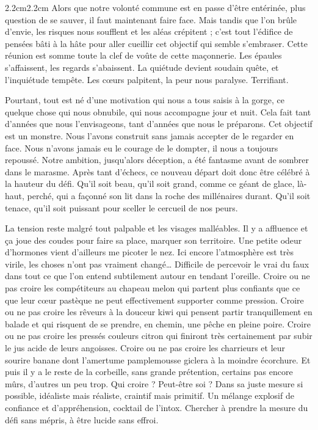 \begin{adjustwidth}{2.2cm}{2.2cm}
Alors que notre volonté commune est en passe d’être entérinée, plus question de se sauver, il faut maintenant faire face. Mais tandis que l’on brûle d’envie, les risques nous soufflent et les aléas crépitent ; c’est tout l’édifice de pensées bâti à la hâte pour aller cueillir cet objectif qui semble s’embraser. Cette réunion est somme toute la clef de voûte de cette maçonnerie. Les épaules s’affaissent, les regards s’abaissent. La quiétude devient soudain quête, et l’inquiétude tempête. Les cœurs palpitent, la peur nous paralyse. Terrifiant.

Pourtant, tout est né d’une motivation qui nous a tous saisis à la gorge, ce quelque chose qui nous obnubile, qui nous accompagne jour et nuit. Cela fait tant d’années que nous l’envisageons, tant d’années que nous le préparons. Cet objectif est un monstre. Nous l’avons construit sans jamais accepter de le regarder en face. Nous n’avons jamais eu le courage de le dompter, il nous a toujours repoussé. Notre ambition, jusqu’alors déception, a été fantasme avant de sombrer dans le marasme. Après tant d’échecs, ce nouveau départ doit donc être célébré à la hauteur du défi. Qu’il soit beau, qu’il soit grand, comme ce géant de glace, là-haut, perché, qui a façonné son lit dans la roche des millénaires durant. Qu’il soit tenace, qu’il soit puissant pour sceller le cercueil de nos peurs.

La tension reste malgré tout palpable et les visages malléables. Il y a affluence et ça joue des coudes pour faire sa place, marquer son territoire. Une petite odeur d’hormones vient d’ailleurs me picoter le nez. Ici encore l’atmosphère est très virile, les choses n’ont pas vraiment changé… Difficile de percevoir le vrai du faux dans tout ce que l’on entend subtilement autour en tendant l’oreille. Croire ou ne pas croire les compétiteurs au chapeau melon qui partent plus confiants que ce que leur cœur pastèque ne peut effectivement supporter comme pression. Croire ou ne pas croire les rêveurs à la douceur kiwi qui pensent partir tranquillement en balade et qui risquent de se prendre, en chemin, une pêche en pleine poire. Croire ou ne pas croire les pressés couleurs citron qui finiront très certainement par subir le jus acide de leurs angoisses. Croire ou ne pas croire les charrieurs et leur sourire banane dont l’amertume pamplemousse giclera à la moindre écorchure. Et puis il y a le reste de la corbeille, sans grande prétention, certains pas encore mûrs, d’autres un peu trop. Qui croire ? Peut-être soi ? Dans sa juste mesure si possible, idéaliste mais réaliste, craintif mais primitif. Un mélange explosif de confiance et d’appréhension, cocktail de l’intox. Chercher à prendre la mesure du défi sans mépris, à être lucide sans effroi.


\end{adjustwidth}
